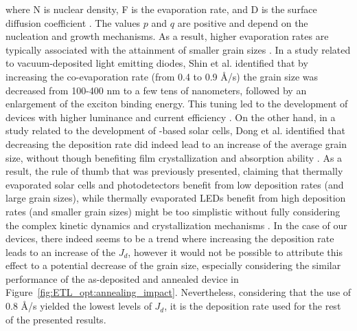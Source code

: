 where N is nuclear density, F is the evaporation rate, and D is the surface diffusion coefficient \cite{Dong2023GrowthFilm}. The values $p$ and $q$ are positive and depend on the nucleation and growth mechanisms. As a result, higher evaporation rates are typically associated with the attainment of smaller grain sizes \cite{Dong2023GrowthFilm, Du2022ThermalOutlook, Shin2020ModulationDiodes}. In a study related to vacuum-deposited  light emitting diodes, Shin et al. identified that by increasing the co-evaporation rate (from 0.4 to 0.9 \AA/s) the grain size was decreased from 100-400 nm to a few tens of nanometers, followed by an enlargement of the exciton binding energy. This tuning led to the development of devices with higher luminance and current efficiency \cite{Shin2020ModulationDiodes}. On the other hand, in a study related to the development of -based solar cells, Dong et al. identified that decreasing the deposition rate did indeed lead to an increase of the average grain size, without though benefiting film crystallization and absorption ability \cite{Dong2023GrowthFilm}. As a result, the rule of thumb that was previously presented, claiming that thermally evaporated solar cells and photodetectors benefit from low deposition rates (and large grain sizes), while thermally evaporated LEDs benefit from high deposition rates (and smaller grain sizes) might be too simplistic without fully considering the complex kinetic dynamics and crystallization mechanisms \cite{Du2022ThermalOutlook}. In the case of our devices, there indeed seems to be a trend where increasing the deposition rate leads to an increase of the $J_d$, however it would not be possible to attribute this effect to a potential decrease of the grain size, especially considering the similar performance of the as-deposited and annealed device in Figure~\ref{fig:ETL_opt:annealing_impact}. Nevertheless, considering that the use of 0.8 \AA/s yielded the lowest levels of $J_d$, it is the deposition rate used for the rest of the presented results. 


